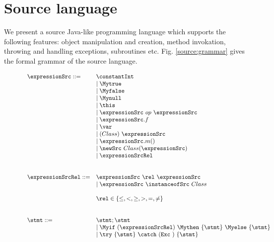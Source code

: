 
\newtheorem{Expression}{Definition}[section]
\newtheorem{ExpressionRel}[Expression]{Definition}
\newtheorem{Statement}[Expression]{Definition}

\section{Source language} \label{source}


We present a source Java-like programming language which supports the following features:
object manipulation and creation, method invokation, throwing and handling exceptions, subroutines etc. Fig. \ref{source:grammar} gives the formal grammar of the source language.
\begin{figure}[ht!] 
\begin{frameit}
   $$ \begin{array} {ll}    
     \expressionSrc ::=         & \constantInt  \\
				& \mid \Mytrue \\ 
				& \mid \Myfalse \\
				& \mid \Mynull  \\
				& \mid \this \\
				& \mid \expressionSrc \ op \ \expressionSrc \\  
				& \mid \expressionSrc.f \\
				& \mid \var \\
  			        & \mid (Class) \ \expressionSrc \\
				& \mid \expressionSrc.m( ) \\
				& \mid  \newSrc \ Class  ( \expressionSrc  ) \\ 
				& \mid \expressionSrcRel \\
                                & \\
				& \\
     \expressionSrcRel ::=      & \expressionSrc \ \rel \ \expressionSrc \\
				& \mid \expressionSrc \ \instanceofSrc \ Class\\
				& \\   
				& \rel \in \{ \le, < ,  \ge, >, = , \neq \}      \\
				& \\
				& \\
      \stmt ::=		        & \stmt;\stmt \\
                                & \mid \Myif \ (\expressionSrcRel) \ \Mythen \ \{ \stmt \} \  \Myelse \ \{ \stmt \}  \\
			        & \mid \try  \ \{ \stmt \}  \ \catch \ ( \mbox{\rm\texttt{Exc} } )\ \{ \stmt \} \\

\end{array}$$
\end{frameit}
\end{figure}
